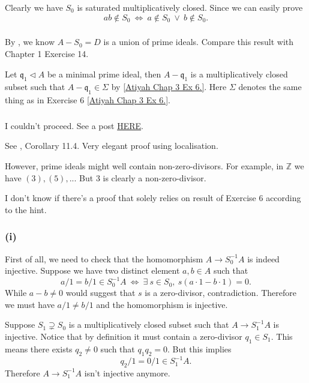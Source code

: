 \subsubsection{}
	Clearly we have $S_0$ is saturated multiplicatively closed. Since we can easily prove 
	\[ab\notin S_0 ~\Leftrightarrow~ a\notin S_0 ~\lor~ b\notin S_0.\]


\subsubsection{}

By , we know $A-S_0=D$ is a union of prime ideals. Compare this result with Chapter 1 Exercise 14.

Let $\mathfrak q_1\triangleleft A$ be a minimal prime ideal, then $A-\mathfrak q_1$ is a multiplicatively closed subset such that $A-\mathfrak q_1\in\Sigma$ by \ref{Atiyah Chap 3 Ex 6.}.
Here $\Sigma$ denotes the same thing as in Exercise 6 \ref{Atiyah Chap 3 Ex 6.}.

\subsubsection{}

I couldn't proceed. See a post \href{https://mathoverflow.net/questions/67382/minimal-primes-and-zero-divisors}{HERE}.

See \cite{altman}, Corollary 11.4. Very elegant proof using localisation. 

However, prime ideals might well contain non-zero-divisors. For example, in $\mathbb Z$ we have $(3), (5),...$ But $3$ is clearly a non-zero-divisor.

I don't know if there's a proof that solely relies on result of Exercise 6 according to the hint.


\subsubsection{(i)}

First of all, we need to check that the homomorphism $A\to S_0^{-1}A$ is indeed injective. Suppose we have two distinct element $a,b\in A$ such that \[a/1=b/1\in S_0^{-1}A ~\Leftrightarrow~ \exists~s\in S_0,~ s(a\cdot 1-b\cdot 1)=0.\] While $a-b\neq 0$ would suggest that $s$ is a zero-divisor, contradiction. Therefore we must have $a/1\neq b/1$ and the homomorphism is injective. 

Suppose $S_1\supsetneq S_0$ is a multiplicatively closed subset such that $A\to S_1^{-1}A$ is injective. Notice that by definition it must contain a zero-divisor $q_1\in S_1$. This means there exists $q_2\neq 0$ such that $q_1q_2=0$. But this implies \[q_2/1=0/1\in S_1^{-1}A.\] Therefore $A\to S_1^{-1}A$ isn't injective anymore. 


